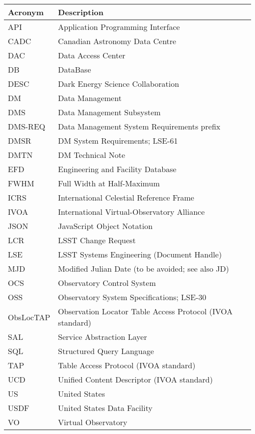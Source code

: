 \addtocounter{table}{-1}
\begin{longtable}{p{}p{}}\hline
\textbf{Acronym} & \textbf{Description}  \\\hline

API & Application Programming Interface \\\hline
CADC & Canadian Astronomy Data Centre \\\hline
DAC & Data Access Center \\\hline
DB & DataBase \\\hline
DESC & Dark Energy Science Collaboration \\\hline
DM & Data Management \\\hline
DMS & Data Management Subsystem \\\hline
DMS-REQ & Data Management System Requirements prefix \\\hline
DMSR & DM System Requirements; LSE-61 \\\hline
DMTN & DM Technical Note \\\hline
EFD & Engineering and Facility Database \\\hline
FWHM & Full Width at Half-Maximum \\\hline
ICRS & International Celestial Reference Frame \\\hline
IVOA & International Virtual-Observatory Alliance \\\hline
JSON & JavaScript Object Notation \\\hline
LCR & LSST Change Request \\\hline
LSE & LSST Systems Engineering (Document Handle) \\\hline
MJD & Modified Julian Date (to be avoided; see also JD) \\\hline
OCS & Observatory Control System \\\hline
OSS & Observatory System Specifications; LSE-30 \\\hline
ObsLocTAP & Observation Locator Table Access Protocol (IVOA standard) \\\hline
SAL & Service Abstraction Layer \\\hline
SQL & Structured Query Language \\\hline
TAP & Table Access Protocol (IVOA standard) \\\hline
UCD & Unified Content Descriptor (IVOA standard) \\\hline
US & United States \\\hline
USDF & United States Data Facility \\\hline
VO & Virtual Observatory \\\hline
\end{longtable}
